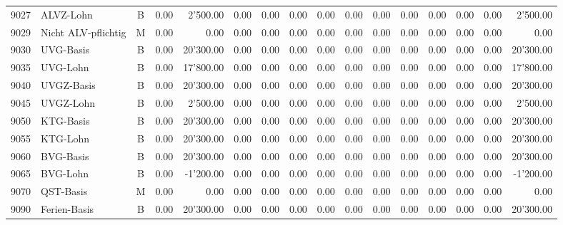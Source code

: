 \documentclass[8pt,a4paper]{extarticle}
\begin{document}
\begin{longtable}{@{\extracolsep{\fill}} l l c r r r r r r r r r r r r r}
9027&ALVZ-Lohn&B&0.00&2'500.00&0.00&0.00&0.00&0.00&0.00&0.00&0.00&0.00&0.00&0.00&2'500.00\\
9029&Nicht ALV-pflichtig&M&0.00&0.00&0.00&0.00&0.00&0.00&0.00&0.00&0.00&0.00&0.00&0.00&0.00\\
9030&UVG-Basis&B&0.00&20'300.00&0.00&0.00&0.00&0.00&0.00&0.00&0.00&0.00&0.00&0.00&20'300.00\\
9035&UVG-Lohn&B&0.00&17'800.00&0.00&0.00&0.00&0.00&0.00&0.00&0.00&0.00&0.00&0.00&17'800.00\\
9040&UVGZ-Basis&B&0.00&20'300.00&0.00&0.00&0.00&0.00&0.00&0.00&0.00&0.00&0.00&0.00&20'300.00\\
9045&UVGZ-Lohn&B&0.00&2'500.00&0.00&0.00&0.00&0.00&0.00&0.00&0.00&0.00&0.00&0.00&2'500.00\\
9050&KTG-Basis&B&0.00&20'300.00&0.00&0.00&0.00&0.00&0.00&0.00&0.00&0.00&0.00&0.00&20'300.00\\
9055&KTG-Lohn&B&0.00&20'300.00&0.00&0.00&0.00&0.00&0.00&0.00&0.00&0.00&0.00&0.00&20'300.00\\
9060&BVG-Basis&B&0.00&20'300.00&0.00&0.00&0.00&0.00&0.00&0.00&0.00&0.00&0.00&0.00&20'300.00\\
9065&BVG-Lohn&B&0.00&-1'200.00&0.00&0.00&0.00&0.00&0.00&0.00&0.00&0.00&0.00&0.00&-1'200.00\\
9070&QST-Basis&M&0.00&0.00&0.00&0.00&0.00&0.00&0.00&0.00&0.00&0.00&0.00&0.00&0.00\\
9090&Ferien-Basis&B&0.00&20'300.00&0.00&0.00&0.00&0.00&0.00&0.00&0.00&0.00&0.00&0.00&20'300.00\\

\end{longtable}
\pagebreak
\end{document}
